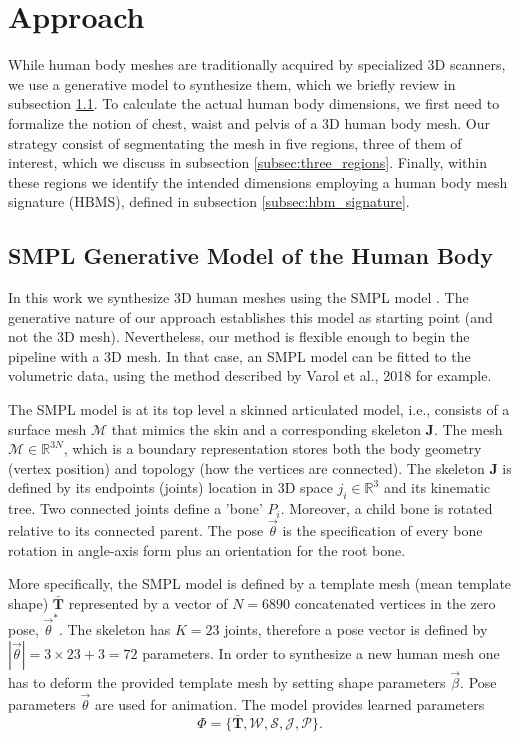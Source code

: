 \documentclass[runningheads, orivec]{llncs}
\begin{document}
\section{Approach}\label{sec:approach}
While human body 
meshes are traditionally acquired by specialized 3D scanners, we use a 
generative model to synthesize them, which we briefly review in 
subsection \ref{subsec:smpl_model}. To calculate the actual human body 
dimensions, we first need to formalize the 
notion of chest, waist and pelvis of a 3D human body mesh. Our strategy consist 
of segmentating the mesh in five regions, 
three of them of interest, which we 
discuss in subsection \ref{subsec:three_regions}. Finally, within these regions 
we identify the intended dimensions employing a human body mesh signature 
(HBMS), 
defined in subsection \ref{subsec:hbm_signature}.

\subsection{SMPL Generative Model of the Human Body}\label{subsec:smpl_model}
In this work we synthesize 3D human meshes using the SMPL
model \cite{Loper.2015}. The generative nature of our approach establishes this 
model as starting point (and not the 3D mesh). Nevertheless, our method is 
flexible enough to begin the pipeline with a 3D mesh. In that case, an SMPL 
model can be fitted to the volumetric data, using the method described by 
Varol et al., 2018 \cite{varol18_bodynet} for example.

The SMPL model is at its top level a skinned articulated 
model, i.e., 
consists of a 
surface mesh $\mathcal{M}$ that mimics the skin and a corresponding skeleton 
$\mathbf{J}$. The mesh $\mathcal{M} \in \mathbb{R}^{3N}$, which is a boundary 
representation stores 
both the body geometry (vertex position) and topology (how the vertices are 
connected). The skeleton $\mathbf{J}$ is defined by its endpoints (joints) 
location in 3D space $j_i \in \mathbb{R}^3$  and its kinematic tree. Two 
connected 
joints define a 'bone' $P_i$. Moreover, a child bone is rotated relative to its 
connected parent. The pose $\vec{\theta}$ is the specification of every bone 
rotation in angle-axis form plus an orientation for the root bone. 

More specifically, the SMPL model is defined by a template mesh (mean template 
shape) $\mathbf{\bar{T}}$ represented by a vector of $N = 6890$ concatenated 
vertices in the zero pose, $\vec{\theta}^*$. The skeleton has $K = 23$ joints, 
therefore a pose vector is defined by $|\vec{\theta}| = 3 \times 23 + 3 = 72$ 
parameters. In order 
to synthesize a new human mesh one has to deform the 
provided template mesh by 
setting shape parameters $\vec{\beta}$. Pose parameters $\vec{\theta}$ are used 
for animation. 
The 
model provides learned parameters
\begin{equation} \label{eq:smpl_params}
\Phi = \{\mathbf{\bar{T}}, \mathcal{W}, \mathcal{S}, \mathcal{J}, 
\mathcal{P}\}.
\end{equation}
\end{document}
